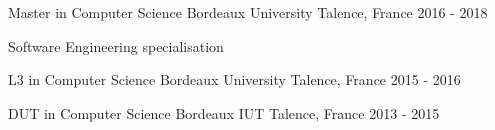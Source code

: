 \newpage
{}
\begin{cventries}

	\cventry
	{Master in Computer Science}
	{Bordeaux University}
	{Talence, France}
	{2016 - 2018}
	{
		\begin{cvitems}
		\item {Software Engineering specialisation}
		\end{cvitems}
	}

	\cventry
	{L3 in Computer Science}
	{Bordeaux University}
	{Talence, France}
	{2015 - 2016}
	{}
	
	\cventry
	{DUT in Computer Science}
	{Bordeaux IUT}
	{Talence, France}
	{2013 - 2015}
	{}

\end{cventries}